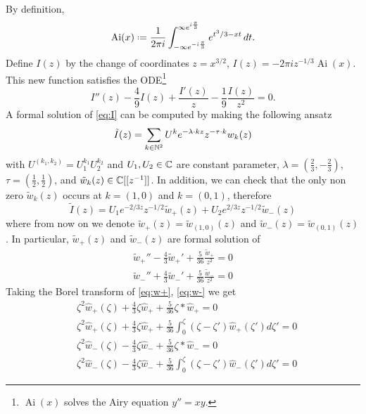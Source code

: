 \documentclass[11pt,a4paper,twoside,leqno,noamsfonts]{amsart}
\numberwithin{equation}{section}
\DeclareMathOperator{\Ai}{Ai}
\begin{document}
\begin{example}[Airy]
By definition,
\[ \Ai(x) \defeq \frac{1}{2\pi i}\int_{-\infty e^{-i\frac{\pi}{3}}}^{\infty e^{i\frac{\pi}{3}}} e^{t^3/3 - xt}\,dt. \]
Define $I(z)$ by the change of coordinates $z=x^{3/2}$, $I(z)=-2\pi iz^{-1/3}\Ai(x)$. This new function satisfies the ODE\footnote{$\Ai(x)$ solves the Airy equation $y''=xy$.}
\begin{equation}\label{eq:I}
I''(z)-\frac{4}{9}I(z)+\frac{I'(z)}{z}-\frac{1}{9}\frac{I(z)}{z^2} = 0.
\end{equation}
A formal solution of \eqref{eq:I} can be computed by making the following ansatz 
\begin{equation}
\tilde{I}(z)=\sum_{k\in\mathbb N^2}U^ke^{-\lambda\cdot k z}z^{-\tau\cdot k}w_k(z)
\end{equation}
with $U^{(k_1,k_2)}=U_1^{k_1}U_2^{k_2}$ and $U_1,U_2\in\mathbb C$ are constant parameter, $\lambda=(\frac{2}{3},-\frac{2}{3})$, $\tau=(\frac{1}{2},\frac{1}{2})$, and $\tilde{w}_k(z)\in\mathbb C[[z^{-1}]]$. In addition, we can check that the only non zero $\tilde{w}_k(z)$ occurs at $k=(1,0)$ and $k=(0,1)$, therefore
\begin{equation}
\tilde{I}(z)=U_1e^{-2/3z}z^{-1/2}\tilde{w}_{+}(z)+U_2e^{2/3z}z^{-1/2}\tilde{w}_{-}(z)
\end{equation}  
where from now on we denote $\tilde{w}_+(z)=\tilde{w}_{(1,0)}(z)$ and $\tilde{w}_-(z)=\tilde{w}_{(0,1)}(z)$. In particular, $\tilde{w}_+(z)$ and $\tilde{w}_-(z)$ are formal solution of 
\begin{align}
\label{eq:w+} \tilde{w}_+''-\frac{4}{3}\tilde{w}_+'+\frac{5}{36}\frac{\tilde{w}_+}{z^2}=0\\
\label{eq:w-} \tilde{w}_-''+\frac{4}{3}\tilde{w}_-'+\frac{5}{36}\frac{\tilde{w}_-}{z^2}=0
\end{align}
Taking the Borel transform of \eqref{eq:w+}, \eqref{eq:w-} we get
\begin{align*}
&\zeta^2\hat{w}_{+}(\zeta)+\frac{4}{3}\zeta\hat{w}_{+}+\frac{5}{36}\zeta\ast\hat{w}_{+}=0\\
&\zeta^2\hat{w}_{+}(\zeta)+\frac{4}{3}\zeta\hat{w}_{+}+\frac{5}{36}\int_0^\zeta(\zeta-\zeta')\hat{w}_{+}(\zeta')d\zeta'=0
\end{align*}
\begin{align*}
&\zeta^2\hat{w}_{-}(\zeta)-\frac{4}{3}\zeta\hat{w}_{-}+\frac{5}{36}\zeta\ast\hat{w}_{-}=0\\
&\zeta^2\hat{w}_{-}(\zeta)-\frac{4}{3}\zeta\hat{w}_{-}+\frac{5}{36}\int_0^\zeta(\zeta-\zeta')\hat{w}_{-}(\zeta')d\zeta'=0
\end{align*}

\end{example}
\end{document}
